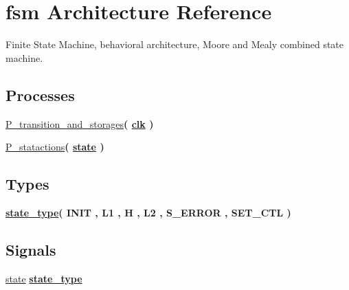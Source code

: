 \hypertarget{classrestart__generator_1_1fsm}{}\section{fsm Architecture Reference}
\label{classrestart__generator_1_1fsm}


Finite State Machine, behavioral architecture, Moore and Mealy combined state machine.  


\subsection*{Processes}
 \begin{DoxyCompactItemize}
\item 
\hyperlink{classrestart__generator_1_1fsm_a99f8caf6038e841bdcf97ebb374b0de4}{P\+\_\+transition\+\_\+and\+\_\+storages}{\bfseries  ( {\bfseries {\bfseries \hyperlink{classrestart__generator_a4a4609c199d30b3adebbeb3a01276ec5}{clk}} \textcolor{vhdlchar}{ }} )}
\item 
\hyperlink{classrestart__generator_1_1fsm_a9ad00cfaa20b4e290a3d3ca73f332adb}{P\+\_\+statactions}{\bfseries  ( {\bfseries {\bfseries \hyperlink{classrestart__generator_1_1fsm_ad5c908d9d78df85b2f0aa3b36b05c3a5}{state}} \textcolor{vhdlchar}{ }} )}
\end{DoxyCompactItemize}
\subsection*{Types}
 \begin{DoxyCompactItemize}
\item 
{\bfseries \hyperlink{classrestart__generator_1_1fsm_a2eac37ebcda1abaa6facae0713adb13c}{state\+\_\+type}{\bfseries \textcolor{vhdlchar}{(}\textcolor{vhdlchar}{ }\textcolor{vhdlchar}{I\+N\+IT}\textcolor{vhdlchar}{ }\textcolor{vhdlchar}{,}\textcolor{vhdlchar}{ }\textcolor{vhdlchar}{L1}\textcolor{vhdlchar}{ }\textcolor{vhdlchar}{,}\textcolor{vhdlchar}{ }\textcolor{vhdlchar}{H}\textcolor{vhdlchar}{ }\textcolor{vhdlchar}{,}\textcolor{vhdlchar}{ }\textcolor{vhdlchar}{L2}\textcolor{vhdlchar}{ }\textcolor{vhdlchar}{,}\textcolor{vhdlchar}{ }\textcolor{vhdlchar}{S\+\_\+\+E\+R\+R\+OR}\textcolor{vhdlchar}{ }\textcolor{vhdlchar}{,}\textcolor{vhdlchar}{ }\textcolor{vhdlchar}{S\+E\+T\+\_\+\+C\+TL}\textcolor{vhdlchar}{ }\textcolor{vhdlchar}{)}\textcolor{vhdlchar}{ }}} 
\end{DoxyCompactItemize}
\subsection*{Signals}
 \begin{DoxyCompactItemize}
\item 
\hyperlink{classrestart__generator_1_1fsm_ad5c908d9d78df85b2f0aa3b36b05c3a5}{state} {\bfseries {\bfseries \hyperlink{classrestart__generator_1_1fsm_a2eac37ebcda1abaa6facae0713adb13c}{state\+\_\+type}} \textcolor{vhdlchar}{ }} 
\end{DoxyCompactItemize}


